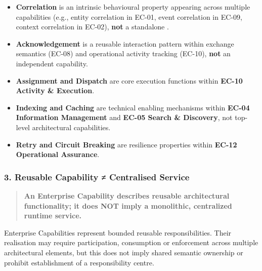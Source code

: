 \begin{itemize}

\item
\textbf{Correlation} is an intrinsic behavioural property appearing across multiple capabilities (e.g., entity correlation in EC-01, event correlation in EC-09, context correlation in EC-02), \textbf{not} a standalone \texttt{}.



\item
\textbf{Acknowledgement} is a reusable interaction pattern within exchange semantics (EC-08) and operational activity tracking (EC-10), \textbf{not} an independent capability.



\item
\textbf{Assignment and Dispatch} are core execution functions within \textbf{EC-10 Activity \& Execution}.



\item
\textbf{Indexing and Caching} are technical enabling mechanisms within \textbf{EC-04 Information Management} and \textbf{EC-05 Search \& Discovery}, not top-level architectural capabilities.



\item
\textbf{Retry and Circuit Breaking} are resilience properties within \textbf{EC-12 Operational Assurance}.



\end{itemize}
\label{rad:enterprise:53}
\subsubsection*{3. Reusable Capability ≠ Centralised Service}
\label{rad:enterprise:54}

\begin{quote}

\textbf{An Enterprise Capability describes reusable architectural functionality; it does NOT imply a monolithic, centralized runtime service.}


\end{quote}
\label{rad:enterprise:56}

Enterprise Capabilities represent bounded reusable responsibilities. Their realisation may require participation, consumption or enforcement across multiple architectural elements, but this does not imply shared semantic ownership or prohibit establishment of a responsibility centre.

